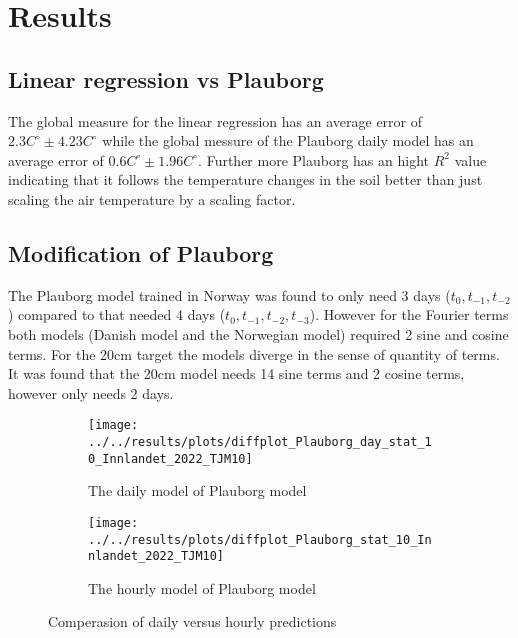 \section{Results}


\begin{table}
	\centering
	\begin{adjustwidth}{-1in}{-1in}
		\resizebox{1.35\textwidth}{!}{
			
		}
	\end{adjustwidth}
\end{table}


\begin{table}
	\centering
	\begin{adjustwidth}{-1in}{-1in}
		\resizebox{1.35\textwidth}{!}{
			
		}
	\end{adjustwidth}
\end{table}

\subsection{Linear regression vs Plauborg}

The global measure for the linear regression has an average error of $2.3C^\circ \pm 4.23 C^\circ$ while the global messure of the Plauborg daily model has an average error of $0.6C^\circ \pm 1.96 C^\circ$. Further more Plauborg has an hight $R^2$ value indicating that it follows the temperature changes in the soil better than just scaling the air temperature by a scaling factor.

\subsection{Modification of Plauborg}

The Plauborg model trained in Norway was found to only need 3 days ($t_0,t_{-1},t_{-2}$) compared to \cite{plauborg_simple_2002} that needed 4 days ($t_0,t_{-1},t_{-2},t_{-3}$). However for the Fourier terms both models (Danish model and the Norwegian model) required 2 sine and cosine terms. For the 20cm target the models diverge in the sense of quantity of terms. It was found that the 20cm model needs 14 sine terms and 2 cosine terms, however only needs 2 days.
\begin{figure}
	\begin{subfigure}{0.45\textwidth}
		\centering
		\texttt{[image: ../../results/plots/diffplot\_Plauborg\_day\_stat\_10\_Innlandet\_2022\_TJM10]}
		\caption[Plauborg daily TJM10]{The daily model of Plauborg model}
		\label{fig:diffplotplauborgdaystat10innlandet2022tjm10}
	\end{subfigure}
	\begin{subfigure}{0.45\textwidth}
		\centering
		\texttt{[image: ../../results/plots/diffplot\_Plauborg\_stat\_10\_Innlandet\_2022\_TJM10]}
		\caption[Plauborg hourly TJM10]{The hourly model of Plauborg model}
		\label{fig:diffplotplauborgstat10innlandet2022tjm10}
	\end{subfigure}
	\caption{Comperasion of daily versus hourly predictions}
\end{figure}


